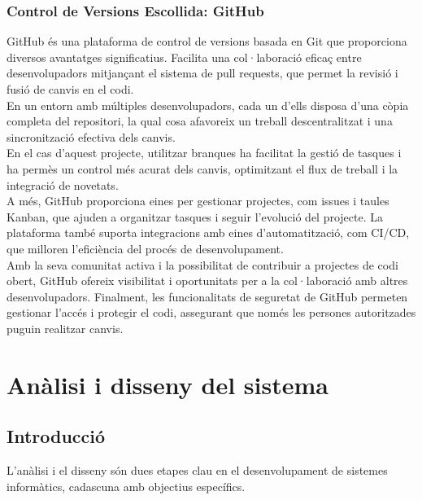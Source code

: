 \documentclass[a4paper,12pt,twoside]{ThesisStyle}
\begin{document}
\subsection{Control de Versions Escollida: GitHub}
\label{subsec: Control de Versions Escollida: GitHub}

GitHub és una plataforma de control de versions basada en Git que proporciona diversos avantatges significatius. Facilita una col·laboració eficaç entre desenvolupadors mitjançant el sistema de pull requests, que permet la revisió i fusió de canvis en el codi.\\

En un entorn amb múltiples desenvolupadors, cada un d'ells disposa d'una còpia completa del repositori, la qual cosa afavoreix un treball descentralitzat i una sincronització efectiva dels canvis.\\

En el cas d'aquest projecte, utilitzar branques ha facilitat la gestió de tasques i ha permès un control més acurat dels canvis, optimitzant el flux de treball i la integració de novetats.\\

A més, GitHub proporciona eines per gestionar projectes, com issues i taules Kanban, que ajuden a organitzar tasques i seguir l'evolució del projecte. La plataforma també suporta integracions amb eines d'automatització, com CI/CD, que milloren l'eficiència del procés de desenvolupament.\\

Amb la seva comunitat activa i la possibilitat de contribuir a projectes de codi obert, GitHub ofereix visibilitat i oportunitats per a la col·laboració amb altres desenvolupadors. Finalment, les funcionalitats de seguretat de GitHub permeten gestionar l'accés i protegir el codi, assegurant que només les persones autoritzades puguin realitzar canvis.


\chapter{Anàlisi i disseny del sistema}
\label{chp:analisi}


\section{Introducció}
\label{sec: Introducció}
L'anàlisi i el disseny són dues etapes clau en el desenvolupament de sistemes informàtics, cadascuna amb objectius específics.\\
\end{document}
